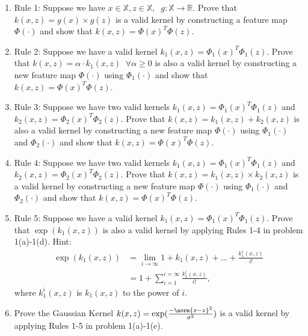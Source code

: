 \documentclass[11pt]{article}
\begin{document}
\begin{enumerate}
\item {} Rule 1: Suppose we have $ x\in \mathbb{X}, z \in \mathbb{X},\;\;  g: \mathbb{X} \rightarrow \mathbb{R}$. Prove that 
$ k(x,z) = g(x)\times g(z)$ is a valid kernel by constructing a feature map $\Phi(\cdot)$ and show that $k(x,z)=\Phi(x)^T\Phi(z)$.
\solution{}

\item {} Rule 2: Suppose we have a valid kernel $k_1(x,z) = \Phi_1(x)^T\Phi_1(z)$. Prove that $k(x,z) = \alpha \cdot k_1(x,z)\;\; \forall \alpha \geq 0$ is also a valid kernel by constructing a new feature map $\Phi(\cdot)$ using  $\Phi_1(\cdot)$ and show that $k(x,z)=\Phi(x)^T\Phi(z)$.   \newline
\solution{}

\item {} Rule 3:  Suppose we have two valid kernels $k_1(x,z) = \Phi_1(x)^T\Phi_1(z)$ and $k_2(x,z)= \Phi_2(x)^T\Phi_2(z)$. Prove that $k(x,z) = k_1(x,z) +  k_2(x,z)$ is also a valid kernel by constructing a new feature map  $\Phi(\cdot)$ using  $\Phi_1(\cdot)$ and  $\Phi_2(\cdot)$  and show that $k(x,z)=\Phi(x)^T\Phi(z)$. \newline
\solution{}

\item {}  Rule 4: Suppose we have two valid kernels $k_1(x,z) = \Phi_1(x)^T\Phi_1(z)$ and $k_2(x,z)= \Phi_2(x)^T\Phi_2(z)$. Prove that $k(x,z) = k_1(x,z) \times k_2(x,z)$ is a valid kernel by  constructing a new feature map $\Phi(\cdot)$ using  $\Phi_1(\cdot)$ and  $\Phi_2(\cdot)$ and show that $k(x,z)=\Phi(x)^T\Phi(z)$.\newline
\solution{}

\item {}  Rule 5: Suppose we have a valid kernel $k_1(x,z) = \Phi_1(x)^T\Phi_1(z)$. Prove that $\exp(k_1(x,z))$ is also a valid kernel by applying 
Rules 1-4 in problem 1(a)-1(d). 
\newline Hint:  
\begin{align*}
\exp(k_1(x,z))
&= \lim_{i \to \infty} 1 + k_1(x,z) + . . . + \frac{k_1^{i}(x,z)}{i!} \\
&= 1 + \sum_{i = 1} ^{i = \infty} \frac{k_1^{i}(x,z)}{i!},
\end{align*}
where $k_1^{i}(x,z)$ is $k_1(x,z)$  to the power of $i$.\newline
\solution{}

\item {} Prove the Gaussian Kernel $k(x,z) = \exp (\frac{-\norm{x-z}^2}{\sigma^2})$ is a valid kernel by applying Rules 1-5 in problem 1(a)-1(e). \newline
\solution{}

\end{enumerate}
\end{document}
